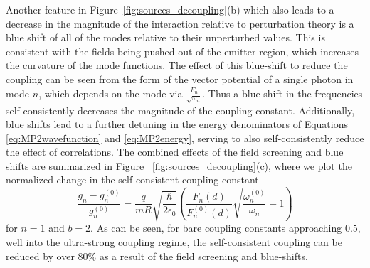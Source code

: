 \documentclass[aps,prb,twocolumn,
	groupedaddress,superscriptaddress,
	amsfonts,amssymb,amsmath,floatfix,
	citeautoscript]{revtex4-1}
\newcommand{\Jadd}[1]{\textcolor{blue}{#1}}
\begin{document}
Another feature in Figure~\ref{fig:sources_decoupling}(b) which also leads to a decrease in the magnitude of the interaction relative to perturbation theory is a blue shift of all of the modes relative to their unperturbed values. This is consistent with the fields being pushed out of the emitter region, which increases the curvature of the mode functions. The effect of this blue-shift to reduce the coupling can be seen from the form of the vector potential of a single photon in mode $n$, which depends on the mode via $\frac{F_n}{\sqrt{\omega_n}}$. Thus a blue-shift in the frequencies self-consistently decreases the magnitude of the coupling constant. Additionally, blue shifts lead to a further detuning in the energy denominators of Equations \ref{eq:MP2wavefunction} and \ref{eq:MP2energy}, serving to also self-consistently reduce the effect of correlations. The combined effects of the field screening and blue shifts are summarized in Figure ~\ref{fig:sources_decoupling}(c), where we plot the normalized change in the self-consistent coupling constant 
\begin{equation}
\frac{g_n-g_n^{(0)}}{g_n^{(0)}} = \frac{q}{mR}\sqrt{\frac{\hbar}{2\epsilon_0}}\left(\frac{F_n(d)}{F^{(0)}_n(d)}\sqrt{\frac{\omega^{(0)}_n}{\omega_n}}-1\right)
\end{equation}
for $n=1$ and $b=2$. As can be seen, for bare coupling constants approaching $0.5$, well into the ultra-strong coupling regime, the self-consistent coupling can be reduced by over 80\% as a result of the field screening and blue-shifts.

\end{document}
